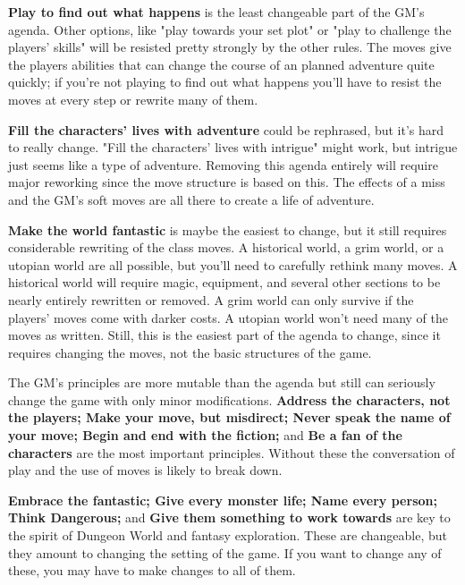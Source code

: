          {\bf Play to find out what happens}  is the least changeable part of the GM's agenda. Other options, like "play towards your set plot" or "play to challenge the players' skills" will be resisted pretty strongly by the other rules. The moves give the players abilities that can change the course of an planned adventure quite quickly; if you're not playing to find out what happens you'll have to resist the moves at every step or rewrite many of them.

       

         {\bf Fill the characters' lives with adventure}  could be rephrased, but it's hard to really change. "Fill the characters' lives with intrigue" might work, but intrigue just seems like a type of adventure. Removing this agenda entirely will require major reworking since the move structure is based on this. The effects of a miss and the GM's soft moves are all there to create a life of adventure.

       

         {\bf Make the world fantastic}  is maybe the easiest to change, but it still requires considerable rewriting of the class moves. A historical world, a grim world, or a utopian world are all possible, but you'll need to carefully rethink many moves. A historical world will require magic, equipment, and several other sections to be nearly entirely rewritten or removed. A grim world can only survive if the players' moves come with darker costs. A utopian world won't need many of the moves as written. Still, this is the easiest part of the agenda to change, since it requires changing the moves, not the basic structures of the game.

       

The GM's principles are more mutable than the agenda but still can seriously change the game with only minor modifications. {\bf Address the characters, not the players; Make your move, but misdirect; Never speak the name of your move; Begin and end with the fiction;}  and {\bf Be a fan of the characters}  are the most important principles. Without these the conversation of play and the use of moves is likely to break down.

       

         {\bf Embrace the fantastic; Give every monster life; Name every person; Think Dangerous;}  and {\bf Give them something to work towards}  are key to the spirit of Dungeon World and fantasy exploration. These are changeable, but they amount to changing the setting of the game. If you want to change any of these, you may have to make changes to all of them.

